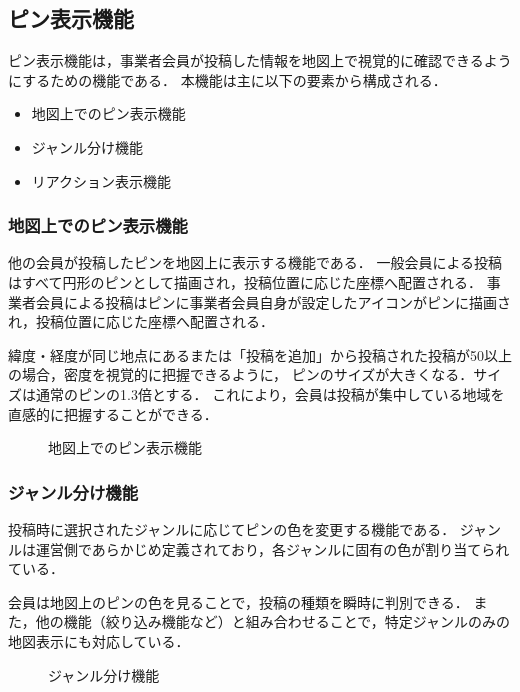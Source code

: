 \subsection{ピン表示機能}
ピン表示機能は，事業者会員が投稿した情報を地図上で視覚的に確認できるようにするための機能である．
本機能は主に以下の要素から構成される．

\begin{itemize}
  \item 地図上でのピン表示機能
  \item ジャンル分け機能
  \item リアクション表示機能
\end{itemize}

\subsubsection{地図上でのピン表示機能}
他の会員が投稿したピンを地図上に表示する機能である．
一般会員による投稿はすべて円形のピンとして描画され，投稿位置に応じた座標へ配置される．
事業者会員による投稿はピンに事業者会員自身が設定したアイコンがピンに描画され，投稿位置に応じた座標へ配置される．

緯度・経度が同じ地点にあるまたは「投稿を追加」から投稿された投稿が50以上の場合，密度を視覚的に把握できるように，
ピンのサイズが大きくなる．サイズは通常のピンの1.3倍とする．
これにより，会員は投稿が集中している地域を直感的に把握することができる．



\begin{figure}[H]
    \centering
    
    \caption{地図上でのピン表示機能}
    \label{fig:pin_main1}
\end{figure}

\subsubsection{ジャンル分け機能}
投稿時に選択されたジャンルに応じてピンの色を変更する機能である．
ジャンルは運営側であらかじめ定義されており，各ジャンルに固有の色が割り当てられている．

会員は地図上のピンの色を見ることで，投稿の種類を瞬時に判別できる．
また，他の機能（絞り込み機能など）と組み合わせることで，特定ジャンルのみの地図表示にも対応している．


\begin{figure}[H]
    \centering
    
    \caption{ジャンル分け機能}
    \label{fig:pin_main2}
\end{figure}